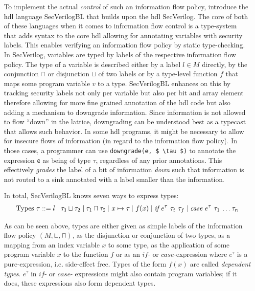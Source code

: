 To implement the actual \textit{control} of such an information flow policy, \citeauthor{Ferraiuolo17} introduce the \gls{hdl} language SecVerilogBL that builds upon the \gls{hdl} SecVerilog.
The core of both of these languages when it comes to information flow control is a type-system that adds syntax to the core \gls{hdl} allowing for annotating variables with security labels.
This enables verifying an information flow policy by static type-checking.
In SecVerilog, variables are typed by labels of the respective information flow policy.
The type of a variable is described either by a label $ l \in M $ directly, by the conjunction $ \sqcap $ or disjunction $ \sqcup $ of two labels or by a type-level function $ f $ that maps some program variable $ v $ to a type.
SecVerilogBL enhances on this by tracking security labels not only per variable but also per bit and array element therefore allowing for more fine grained annotation of the \gls{hdl} code but also adding a mechanism to downgrade information.
Since information is not allowed to flow \enquote{down} in the lattice, downgrading can be understood best as a typecast that allows such behavior.
In some \gls{hdl} programs, it might be necessary to allow for insecure flows of information (in regard to the information flow policy).
In those cases, a programmer can use \lstinline[mathescape]{downgrade(e, $ \tau $)} to annotate the expression \lstinline{e} as being of type $ \tau $, regardless of any prior annotations.
This effectively \textit{grades} the label of a bit of information \textit{down} such that information is not routed to a sink annotated with a label smaller than the information.

In total, SecVerilogBL knows seven ways to express types:
\begin{align*}
    \text{Types } \tau ::= l \mid \tau_1 \sqcup \tau_2 \mid \tau_1 \sqcap \tau_2 \mid x \mapsto \tau \mid f(x) \mid \textit{if $ e^\tau $ $ \tau_t $ $ \tau_f $} \mid \textit{case $ e^\tau $ $ \tau_1 $ \dots $ \tau_n $}
\end{align*}

As can be seen above, types are either given as simple labels of the information flow policy $ (M, \sqcup, \sqcap) $, as the disjunction or conjunction of two types, as a mapping from an index variable $ x $ to some type, as the application of some program variable $ x $ to the function $ f $ or as an $ \textit{if} $- or $ \textit{case} $-expression where $ e^\tau $ is a pure-expression, i.e. side-effect free.
Types of the form $ f(x) $ are called \textit{dependent types}.
$ e^\tau $ in $ \textit{if} $- or $ \textit{case} $- expressions might also contain program variables; if it does, these expressions also form dependent types.

